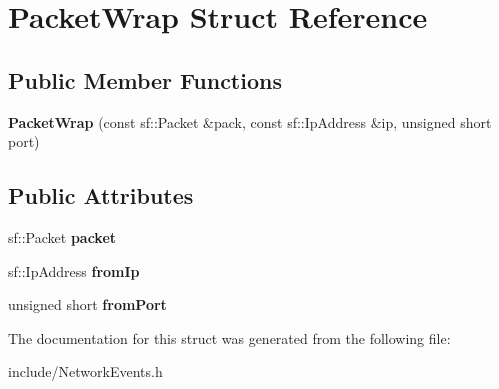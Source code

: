 \hypertarget{struct_packet_wrap}{\section{Packet\-Wrap Struct Reference}
\label{struct_packet_wrap}
}
\subsection*{Public Member Functions}
\begin{DoxyCompactItemize}
\item 
\hypertarget{struct_packet_wrap_a848a1388a9c753487fc4d2805b400b70}{{\bfseries Packet\-Wrap} (const sf\-::\-Packet \&pack, const sf\-::\-Ip\-Address \&ip, unsigned short port)}\label{struct_packet_wrap_a848a1388a9c753487fc4d2805b400b70}

\end{DoxyCompactItemize}
\subsection*{Public Attributes}
\begin{DoxyCompactItemize}
\item 
\hypertarget{struct_packet_wrap_a1aa4f42a3a2506316a4580ade8b0be5a}{sf\-::\-Packet {\bfseries packet}}\label{struct_packet_wrap_a1aa4f42a3a2506316a4580ade8b0be5a}

\item 
\hypertarget{struct_packet_wrap_aee7440a6f2cf105f27e084a6d95928f3}{sf\-::\-Ip\-Address {\bfseries from\-Ip}}\label{struct_packet_wrap_aee7440a6f2cf105f27e084a6d95928f3}

\item 
\hypertarget{struct_packet_wrap_a687da347d509e1105f0ee578704a188e}{unsigned short {\bfseries from\-Port}}\label{struct_packet_wrap_a687da347d509e1105f0ee578704a188e}

\end{DoxyCompactItemize}


The documentation for this struct was generated from the following file\-:\begin{DoxyCompactItemize}
\item 
include/Network\-Events.\-h\end{DoxyCompactItemize}
